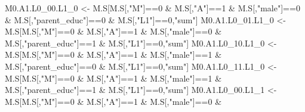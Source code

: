 \documentclass[
]{book}
\newenvironment{Shaded}{\begin{snugshade}}{\end{snugshade}}
\newcommand{\DecValTok}[1]{\textcolor[rgb]{0.00,0.00,0.81}{#1}}
\newcommand{\NormalTok}[1]{#1}
\newcommand{\OtherTok}[1]{\textcolor[rgb]{0.56,0.35,0.01}{#1}}
\newcommand{\SpecialCharTok}[1]{\textcolor[rgb]{0.00,0.00,0.00}{#1}}
\newcommand{\StringTok}[1]{\textcolor[rgb]{0.31,0.60,0.02}{#1}}
\begin{document}
\begin{Shaded}
\begin{Highlighting}[]
\NormalTok{  M0.A1.L0\_00.L1\_0 }\OtherTok{\textless{}{-}}\NormalTok{ M.S[M.S[,}\StringTok{"M"}\NormalTok{]}\SpecialCharTok{==}\DecValTok{0} \SpecialCharTok{\&}\NormalTok{ M.S[,}\StringTok{"A"}\NormalTok{]}\SpecialCharTok{==}\DecValTok{1} \SpecialCharTok{\&}\NormalTok{ M.S[,}\StringTok{"male"}\NormalTok{]}\SpecialCharTok{==}\DecValTok{0} \SpecialCharTok{\&} 
\NormalTok{                            M.S[,}\StringTok{"parent\_educ"}\NormalTok{]}\SpecialCharTok{==}\DecValTok{0} \SpecialCharTok{\&}\NormalTok{ M.S[,}\StringTok{"L1"}\NormalTok{]}\SpecialCharTok{==}\DecValTok{0}\NormalTok{,}\StringTok{"sum"}\NormalTok{]}
\NormalTok{  M0.A1.L0\_01.L1\_0 }\OtherTok{\textless{}{-}}\NormalTok{ M.S[M.S[,}\StringTok{"M"}\NormalTok{]}\SpecialCharTok{==}\DecValTok{0} \SpecialCharTok{\&}\NormalTok{ M.S[,}\StringTok{"A"}\NormalTok{]}\SpecialCharTok{==}\DecValTok{1} \SpecialCharTok{\&}\NormalTok{ M.S[,}\StringTok{"male"}\NormalTok{]}\SpecialCharTok{==}\DecValTok{0} \SpecialCharTok{\&} 
\NormalTok{                            M.S[,}\StringTok{"parent\_educ"}\NormalTok{]}\SpecialCharTok{==}\DecValTok{1} \SpecialCharTok{\&}\NormalTok{ M.S[,}\StringTok{"L1"}\NormalTok{]}\SpecialCharTok{==}\DecValTok{0}\NormalTok{,}\StringTok{"sum"}\NormalTok{]}
\NormalTok{  M0.A1.L0\_10.L1\_0 }\OtherTok{\textless{}{-}}\NormalTok{ M.S[M.S[,}\StringTok{"M"}\NormalTok{]}\SpecialCharTok{==}\DecValTok{0} \SpecialCharTok{\&}\NormalTok{ M.S[,}\StringTok{"A"}\NormalTok{]}\SpecialCharTok{==}\DecValTok{1} \SpecialCharTok{\&}\NormalTok{ M.S[,}\StringTok{"male"}\NormalTok{]}\SpecialCharTok{==}\DecValTok{1} \SpecialCharTok{\&} 
\NormalTok{                            M.S[,}\StringTok{"parent\_educ"}\NormalTok{]}\SpecialCharTok{==}\DecValTok{0} \SpecialCharTok{\&}\NormalTok{ M.S[,}\StringTok{"L1"}\NormalTok{]}\SpecialCharTok{==}\DecValTok{0}\NormalTok{,}\StringTok{"sum"}\NormalTok{]}
\NormalTok{  M0.A1.L0\_11.L1\_0 }\OtherTok{\textless{}{-}}\NormalTok{ M.S[M.S[,}\StringTok{"M"}\NormalTok{]}\SpecialCharTok{==}\DecValTok{0} \SpecialCharTok{\&}\NormalTok{ M.S[,}\StringTok{"A"}\NormalTok{]}\SpecialCharTok{==}\DecValTok{1} \SpecialCharTok{\&}\NormalTok{ M.S[,}\StringTok{"male"}\NormalTok{]}\SpecialCharTok{==}\DecValTok{1} \SpecialCharTok{\&} 
\NormalTok{                            M.S[,}\StringTok{"parent\_educ"}\NormalTok{]}\SpecialCharTok{==}\DecValTok{1} \SpecialCharTok{\&}\NormalTok{ M.S[,}\StringTok{"L1"}\NormalTok{]}\SpecialCharTok{==}\DecValTok{0}\NormalTok{,}\StringTok{"sum"}\NormalTok{]}
\NormalTok{  M0.A1.L0\_00.L1\_1 }\OtherTok{\textless{}{-}}\NormalTok{ M.S[M.S[,}\StringTok{"M"}\NormalTok{]}\SpecialCharTok{==}\DecValTok{0} \SpecialCharTok{\&}\NormalTok{ M.S[,}\StringTok{"A"}\NormalTok{]}\SpecialCharTok{==}\DecValTok{1} \SpecialCharTok{\&}\NormalTok{ M.S[,}\StringTok{"male"}\NormalTok{]}\SpecialCharTok{==}\DecValTok{0} \SpecialCharTok{\&} 

\end{Highlighting}
\end{Shaded}
\end{document}
